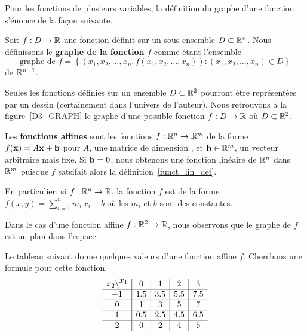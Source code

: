 {Pour les fonctions de plusieurs variables, la définition du graphe
d'une fonction s'énonce de la façon suivante.

\begin{defn} 
Soit $f:D\rightarrow \mathbb{R}$ une fonction définit sur un sous-ensemble
$D\subset \mathbb{R}^n$.  Nous définissons le {\bfseries graphe de la fonction}
$f$ comme étant l'ensemble
\[
\text{graphe de }f = \left\{ (x_1,x_2,\ldots,x_n, f(x_1,x_2,\ldots,x_n))
: (x_1,x_2,\ldots,x_n) \in D \right\}
\]
de $\mathbb{R}^{n+1}$.
\end{defn}

Seules les fonctions définies sur un ensemble $D \subset \mathbb{R}^2$
pourront être représentées par un dessin (certainement dans l'univers
de l'auteur).  Nous retrouvons à la figure~\ref{D3_GRAPH} le
graphe d'une possible fonction
$f:D \rightarrow \mathbb{R}$ où $D\subset \mathbb{R}^2$.  


\begin{defn} 
Les {\bfseries fonctions affines} sont les fonctions
$f:\mathbb{R}^n \to \mathbb{R}^m$ de la forme $f(\mathbf{x}) = A \mathbf{x} + \mathbf{b}$
pour $A$, une matrice de dimension , et $\mathbf{b} \in \mathbb{R}^m$,
un vecteur arbitraire mais fixe.  Si $\mathbf{b}=0$, nous obtenons une
fonction linéaire de $\mathbb{R}^n$ dans $\mathbb{R}^m$ puisque $f$ satsifait alors
la définition~\ref{funct_lin_def}.

En particulier, si $f:\mathbb{R}^n \to \mathbb{R}$, la fonction $f$ est de la forme
$\displaystyle f(x,y) = \sum_{i=1}^n m_i\,x_i +b$ où les $m_i$ et
$b$ sont des constantes.
\end{defn}

Dans le cas d'une fonction affine $f:\mathbb{R}^2 \to \mathbb{R}$, nous observons que le
graphe de $f$ est un plan dans l'espace.

\begin{egg}
Le tableau suivant donne quelques valeurs d'une fonction affine $f$.
Cherchons une formule pour cette fonction.
\[
\begin{array}{c|c|c|c|c}
x_2 \backslash \raisebox{1ex}{$x_1$} & 0 & 1 & 2 & 3 \\
\hline
-1 & 1.5 & 3.5 & 5.5 & 7.5 \\
\hline
0 & 1 & 3 & 5 & 7 \\
\hline
1 & 0.5 & 2.5 & 4.5 & 6.5 \\
\hline
2 & 0 & 2 & 4 & 6
\end{array}
\]


\end{egg}}
